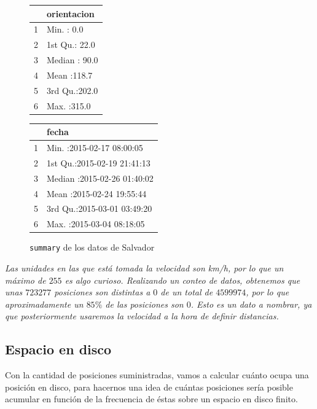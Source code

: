 \documentclass[a4paper, 12pt]{article}
\begin{document}
\begin{figure}

\begin{center}
\begin{minipage}[t]{.3\textwidth}
	\begin{tabular}{rl}
  \hline
 &       orientacion \\ 
  \hline
1 & Min.   :  0.0   \\ 
  2 & 1st Qu.: 22.0   \\ 
  3 & Median : 90.0   \\ 
  4 & Mean   :118.7   \\ 
  5 & 3rd Qu.:202.0   \\ 
  6 & Max.   :315.0   \\ 
   \hline
\end{tabular}
\end{minipage}\hfil
\begin{minipage}[t]{.5\textwidth}
	\begin{tabular}{rl}
  \hline
 &       fecha \\ 
  \hline
1 & Min.   :2015-02-17 08:00:05   \\ 
  2 & 1st Qu.:2015-02-19 21:41:13   \\ 
  3 & Median :2015-02-26 01:40:02   \\ 
  4 & Mean   :2015-02-24 19:55:44   \\ 
  5 & 3rd Qu.:2015-03-01 03:49:20   \\ 
  6 & Max.   :2015-03-04 08:18:05   \\ 
   \hline
\end{tabular}
\end{minipage}
\end{center}
\caption{\texttt{summary} de los datos de Salvador}
\end{figure}

\textit{Las unidades en las que est\'a tomada la velocidad son km/h, por lo que un m\'aximo de $255$ es algo curioso. Realizando un conteo de datos, obtenemos que unas $723277$ posiciones son distintas a $0$ de un total de $4599974$, por lo que aproximadamente un $85\%$ de las posiciones son $0$. Esto es un dato a nombrar, ya que posteriormente usaremos la velocidad a la hora de definir distancias.}

\pagebreak
\subsection{Espacio en disco}

Con la cantidad de posiciones suministradas, vamos a calcular cu\'anto ocupa una posici\'on en disco, para hacernos una idea de cu\'antas posiciones ser\'ia posible acumular en funci\'on de la frecuencia de \'estas sobre un espacio en disco finito.\\
\end{document}
